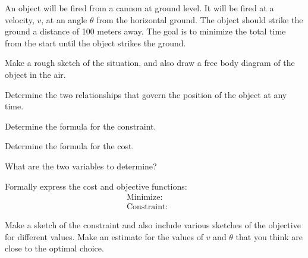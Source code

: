 \begin{problem}
\item An object will be fired from a cannon at ground level. It will
  be fired at a velocity, $v$, at an angle $\theta$ from the
  horizontal ground.  The object should strike the ground a distance
  of 100 meters away. The goal is to minimize the total time from the
  start until the object strikes the ground.
  \begin{subproblem}
  \item Make a rough sketch of the situation, and also draw a free
    body diagram of the object in the air.
    \vfill
  \item Determine the two relationships that govern the position of
    the object at any time.
    \vfill
  \item Determine the formula for the constraint.
    \vfill
  \item Determine the formula for the cost.
    \vfill

    \clearpage

  \item What are the two variables to determine?
    \vspace{2em}

  \item Formally express the cost and objective functions:
    \begin{eqnarray*}
      \mathrm{Minimize:} & &  \\
      \mathrm{Constraint:} & &
    \end{eqnarray*}


  \item Make a sketch of the constraint and also include various
    sketches of the objective for different values. Make an estimate
    for the values of $v$ and $\theta$ that you think are close to the
    optimal choice.

    \vfill

  \item

  \end{subproblem}

\end{problem}





